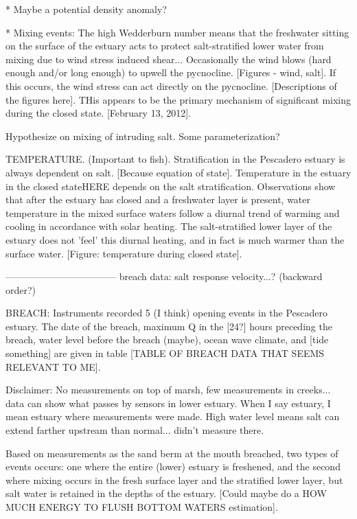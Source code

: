 * Maybe a potential density anomaly?


* Mixing events:
The high Wedderburn number means that the freshwater sitting on the surface of the estuary acts to protect salt-stratified lower water from mixing due to wind stress induced shear... Occasionally the wind blows (hard enough and/or long enough) to upwell the pycnocline. [Figures - wind, salt]. If this occurs, the wind stress can act directly on the pycnocline. [Descriptions of the figures here].  THis appears to be the primary mechanism of significant mixing during the closed state.  [February 13, 2012]. 



Hypothesize on mixing of intruding salt. Some parameterization?

TEMPERATURE. (Important to fish).
Stratification in the Pescadero estuary is always dependent on salt. [Because equation of state]. Temperature in the estuary in the closed state{HERE} depends on the salt stratification. Observations show that after the estuary has closed and a freshwater layer is present, water temperature in the mixed surface waters follow a diurnal trend of warming and cooling in accordance with solar heating. The salt-stratified lower layer of the estuary does not 'feel' this diurnal heating, and in fact is much warmer than the surface water. [Figure: temperature during closed state]. 

-----------------------------------
breach data: 
salt response
velocity...? (backward order?)


BREACH:
Instruments recorded 5 (I think) opening events in the Pescadero estuary. The date of the breach, maximum Q in the [24?] hours preceding the breach, water level before the breach (maybe), ocean wave climate, and [tide something] are given in table [TABLE OF BREACH DATA THAT SEEMS RELEVANT TO ME]. 

{Disclaimer: No measurements on top of marsh, few measurements in creeks... data can show what passes by sensors in lower estuary. When I say estuary, I mean estuary where measurements were made. High water level means salt can extend farther upstream than normal... didn't measure there}. 

Based on measurements as the sand berm at the mouth breached, two types of events occurs: one where the entire (lower) estuary is freshened, and the second where mixing occurs in the fresh surface layer and the stratified lower layer, but salt water is retained in the depths of the estuary. [Could maybe do a HOW MUCH ENERGY TO FLUSH BOTTOM WATERS estimation]. 

